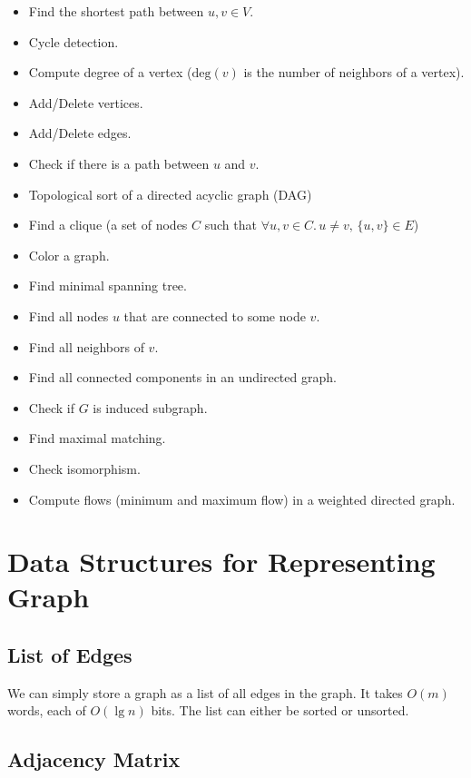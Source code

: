 \begin{multicols*}{2}
    \begin{itemize}
        \item Find the shortest path between $u,v\in V$.
        \item Cycle detection.
        \item Compute degree of a vertex ($\mathrm{deg}(v)$ is the number of neighbors of a vertex).
        \item Add/Delete vertices.
        \item Add/Delete edges.
        \item Check if there is a path between $u$ and $v$.
        \item Topological sort of a directed acyclic graph (DAG)
        \item Find a clique (a set of nodes $C$ such that $\forall u,v \in C.\, u \neq v,\, \{u,v\} \in E$)
        \item Color a graph.
        \item Find minimal spanning tree.
        \item Find all nodes $u$ that are connected to some node $v$.
        \item Find all neighbors of $v$.
        \item Find all connected components in an undirected graph.
        \item Check if $G$ is induced subgraph.
        \item Find maximal matching.
        \item Check isomorphism.
        \item Compute flows (minimum and maximum flow) in a weighted directed graph.
    \end{itemize}
\end{multicols*}

\section{Data Structures for Representing Graph}

\subsection{List of Edges}

We can simply store a graph as a list of all edges in the graph. It takes $O(m)$ words, each of $O(\lg n)$ bits. The list can either be sorted or unsorted.

\subsection{Adjacency Matrix}

